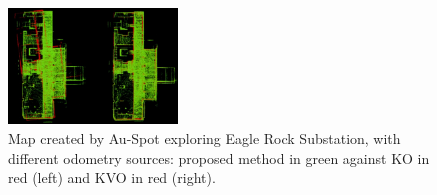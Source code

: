 \documentclass[letterpaper, 10pt, conference]{ieeeconf}      %
\newcommand{\inst}[1]{{\color{orange} #1 }} %
\begin{document}







\begin{figure}[t!]
  \centering
  \includegraphics[width=0.4\textwidth]{spot_iros/graphics/spot_station.pdf}
  \caption{Map created by Au-Spot exploring Eagle Rock Substation, with different odometry sources: proposed method in green against KO in red (left) and KVO in red (right).}
  \label{spot_eagle_rock}
\end{figure}
\end{document}
